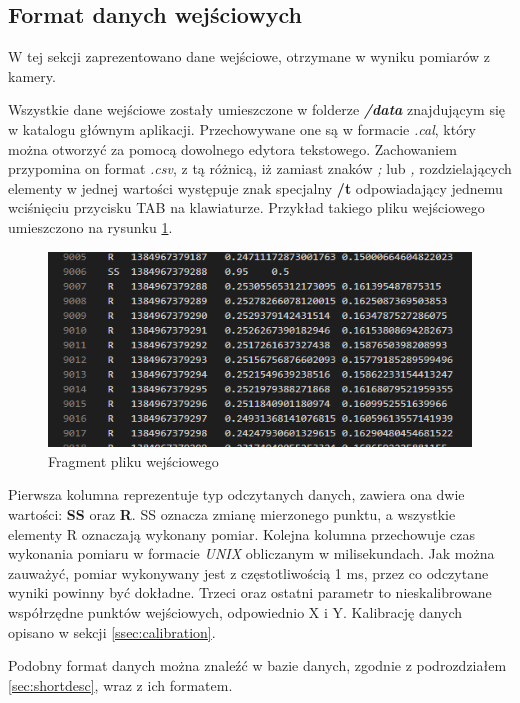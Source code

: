 \subsection{Format danych wejściowych}
\label{ssec:importdata}
W tej sekcji zaprezentowano dane wejściowe, otrzymane w wyniku pomiarów z kamery.\par
Wszystkie dane wejściowe zostały umieszczone w folderze \emph{\textbf{/data}} znajdującym się w katalogu głównym aplikacji. Przechowywane one są w formacie \emph{.cal}, który można otworzyć za pomocą dowolnego edytora tekstowego. Zachowaniem przypomina on format \emph{.csv}, z tą różnicą, iż zamiast znaków \emph{;} lub \emph{,} rozdzielających elementy w jednej wartości występuje znak specjalny \textbf{/t} odpowiadający jednemu wciśnięciu przycisku TAB na klawiaturze. Przykład takiego pliku wejściowego umieszczono na rysunku \ref{fig:plikwejsciowy}.
\begin{figure}[H]
        \centering
        \captionsetup{justification=centering,margin=2cm}
        \includegraphics[width=0.8\linewidth]{resources/plikwejsciowy.png}
        \caption{Fragment pliku wejściowego}
        \label{fig:plikwejsciowy}
\end{figure}
Pierwsza kolumna reprezentuje typ odczytanych danych, zawiera ona dwie wartości: \textbf{SS} oraz \textbf{R}. SS oznacza zmianę mierzonego punktu, a wszystkie elementy R oznaczają wykonany pomiar. Kolejna kolumna przechowuje czas wykonania pomiaru w formacie \emph{UNIX} obliczanym w milisekundach. Jak można zauważyć, pomiar wykonywany jest z częstotliwością 1 ms, przez co odczytane wyniki powinny być dokładne. Trzeci oraz ostatni parametr to nieskalibrowane współrzędne punktów wejściowych, odpowiednio X i Y. Kalibrację danych opisano w sekcji \ref{ssec:calibration}.\par
Podobny format danych można znaleźć w bazie danych, zgodnie z podrozdziałem \ref{sec:shortdesc}, wraz z ich formatem.
